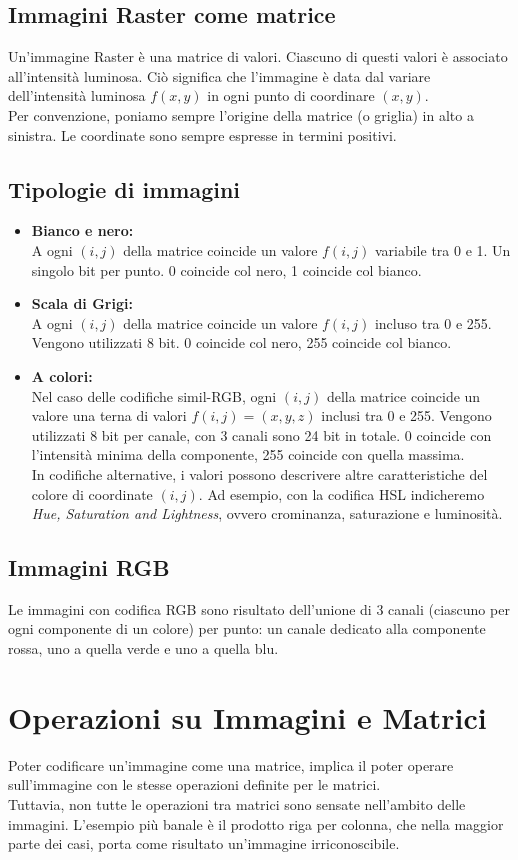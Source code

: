 \documentclass{report}
\begin{document}
\section{Immagini Raster come matrice}
Un'immagine Raster è una matrice di valori. Ciascuno di questi valori è associato all'intensità luminosa. Ciò significa che l'immagine è data dal variare dell'intensità luminosa $f(x,y)$ in ogni punto di coordinare $(x, y)$.\\
Per convenzione, poniamo sempre l'origine della matrice (o griglia) in alto a sinistra. Le coordinate sono sempre espresse in termini positivi.
\section{Tipologie di immagini}
\begin{itemize}
	\item \textbf{Bianco e nero:}\\
	      A ogni $(i, j)$ della matrice coincide un valore $f(i, j)$ variabile tra 0 e 1. Un singolo bit per punto. 0 coincide col nero, 1 coincide col bianco.
	\item \textbf{Scala di Grigi:}\\
	      A ogni $(i, j)$ della matrice coincide un valore $f(i, j)$ incluso tra 0 e 255. Vengono utilizzati 8 bit. 0 coincide col nero, 255 coincide col bianco.
	\item \textbf{A colori:}\\
	      Nel caso delle codifiche simil-RGB, ogni $(i, j)$ della matrice coincide un valore una terna di valori $f(i, j) = (x, y, z)$ inclusi tra 0 e 255. Vengono utilizzati 8 bit per canale, con 3 canali sono 24 bit in totale. 0 coincide con l'intensità minima della componente, 255 coincide con quella massima.\\
	      In codifiche alternative, i valori possono descrivere altre caratteristiche del colore di coordinate $(i, j)$. Ad esempio, con la codifica HSL indicheremo \textit{Hue, Saturation and Lightness}, ovvero crominanza, saturazione e luminosità.
\end{itemize}
\section{Immagini RGB}
Le immagini con codifica RGB sono risultato dell'unione di 3 canali (ciascuno per ogni componente di un colore) per punto: un canale dedicato alla componente rossa, uno a quella verde e uno a quella blu.
\newpage
\chapter{Operazioni su Immagini e Matrici}
Poter codificare un'immagine come una matrice, implica il poter operare\\
sull'immagine con le stesse operazioni definite per le matrici.\\
Tuttavia, non tutte le operazioni tra matrici sono sensate nell'ambito delle immagini. L'esempio più banale è il prodotto riga per colonna, che nella maggior parte dei casi, porta come risultato un'immagine irriconoscibile.
\end{document}
